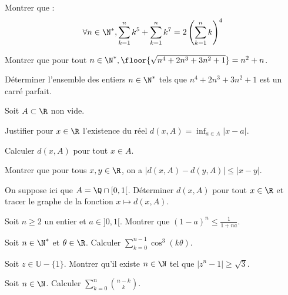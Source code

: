 \documentclass[11pt,a4paper]{article}
\begin{document}
\begin{exercise}
Montrer que :
$$\forall n\in\N^*, \sum_{k=1}^nk^5+\sum_{k=1}^nk^7=2\left(\sum_{k=1}^nk\right)^4$$
\end{exercise}

\begin{exercise}
\begin{questions}
\item Montrer que pour tout $n\in\N^*, \floor{\sqrt{n^4+2n^3+3n^2+1}}=n^2+n$.
\item Déterminer l'ensemble des entiers $n\in\N^*$ tels que $n^4+2n^3+3n^2+1$ est un carré parfait.
\end{questions}
\end{exercise}

\begin{exercise}
\begin{questions}
\item Soit $A\subset\R$ non vide.
\begin{questions}
\item Justifier pour $x\in\R$ l'existence du réel $d(x,A)=\inf_{a\in A}|x-a|$.
\item Calculer $d(x,A)$ pour tout $x\in A$.
\item Montrer que pour tous $x,y\in\R$, on a $|d(x,A)-d(y,A)|\le|x-y|$.
\end{questions}
\item On suppose ici que $A=\Q\cap[0,1[$. Déterminer $d(x,A)$ pour tout $x\in\R$ et tracer le graphe de la fonction $x\mapsto d(x,A)$.
\end{questions}
\end{exercise}

\begin{exercise}
Soit $n \ge 2$ un entier et $a \in ]0,1[$. Montrer que $(1-a)^n \le \frac{1}{1+na}$.
\end{exercise}

\begin{exercise}
Soit $n\in\N^*$ et $\theta\in\R$. Calculer $\displaystyle\sum_{k=0}^{n-1}\cos^3(k\theta)$.
\end{exercise}

\begin{exercise}
Soit $z\in \mathbb{U} - \{1\}$. Montrer qu'il existe $n\in\N$ tel que $\left| z^n - 1 \right| \ge \sqrt{3}$.
\end{exercise}

\begin{exercise}
Soit $n\in\N$. Calculer $\displaystyle\sum_{k=0}^{n}\binom{n-k}{k}$.
\end{exercise}
\end{document}
